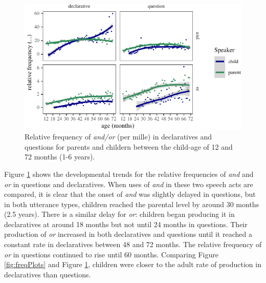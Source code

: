 \documentclass[
  english,
  ,man,floatsintext]{apa6}
\begin{document}
\begin{figure}[tb]

{\centering \includegraphics{figs/ageSpeechActPlot-1} 

}

\caption{Relative frequency of \textit{and/or} (per mille) in declaratives and questions for parents and childern between the child-age of 12 and 72 months (1-6 years).}\label{fig:ageSpeechActPlot}
\end{figure}

Figure \ref{fig:ageSpeechActPlot} shows the developmental trends for the relative frequencies of \emph{and} and \emph{or} in questions and declaratives. When uses of \emph{and} in these two speech acts are compared, it is clear that the onset of \emph{and} was slightly delayed in questions, but in both utterance types, children reached the parental level by around 30 months (2.5 years). There is a similar delay for \emph{or}: children began producing it in declaratives at around 18 months but not until 24 months in questions. Their production of \emph{or} increased in both declaratives and questions until it reached a constant rate in declaratives between 48 and 72 months. The relative frequency of \emph{or} in questions continued to rise until 60 months. Comparing Figure \ref{fig:freqPlots} and Figure \ref{fig:ageSpeechActPlot}, children were closer to the adult rate of production in declaratives than questions.
\end{document}
